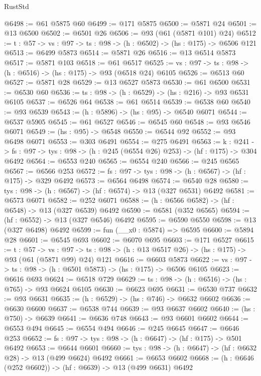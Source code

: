\begin{lexlean}{RustStd}
\begin{coremodule}
@6498 := @61 @5875 @60
@6499 := @171 @5875
@6500 := @5871 @24
@6501 := @13 @6500
@6502 := @6501 @26
@6506 := @93 (@61 (@5871 @101) @24)
@6512 := {t : @57} -> {vs : @97} -> {ts : @98} -> (h : @6502) -> (hs : @175) -> @6506 @121
@6513 := @6499 @5873
@6514 := @5871 @26
@6516 := @13 @6514 @5873
@6517 := @5871 @103
@6518 := @61 @6517
@6525 := {vs : @97} -> {ts : @98} -> (h : @6516) -> (hs : @175) -> @93 (@6518 @24) @6105
@6526 := @6513 @60
@6527 := @5871 @28
@6529 := @13 @6527 @5873
@6530 := @61 @6500
@6531 := @6530 @60
@6536 := {ts : @98} -> (h : @6529) -> (hs : @216) -> @93 @6531 @6105
@6537 := @6526 @64
@6538 := @61 @6514
@6539 := @6538 @60
@6540 := @93 @6539
@6543 := (h : @5896) -> (hs : @95) -> @6540 @6071
@6544 := @6537 @5905
@6545 := @61 @6527
@6546 := @6545 @60
@6548 := @93 @6546 @6071
@6549 := (hs : @95) -> @6548
@6550 := @6544 @92
@6552 := @93 @6498 @6071
@6553 := @303 @6491
@6554 := @275 @6491
@6563 := {k : @241} ->
  {fs : @97} -> {tys : @98} -> (h : @245 (@6554 @26) @253) -> (hf : @175) -> @304 @6492
@6564 := @6553 @240
@6565 := @6554 @240
@6566 := @245 @6565
@6567 := @6566 @253
@6572 := {fs : @97} -> {tys : @98} -> (h : @6567) -> (hf : @175) -> @329 @6492
@6573 := @6564 @6498
@6574 := @6540 @28
@6580 := {tys : @98} -> (h : @6567) -> (hf : @6574) -> @13 (@327 @6531) @6492
@6581 := @6573 @6071
@6582 := @252 @6071
@6588 := (h : @6566 @6582) -> (hf : @6548) -> @13 (@327 @6539) @6492
@6590 := @6581 (@352 @6565)
@6594 := (hf : @6552) -> @13 (@327 @6546) @6492
@6595 := @6590 @6550
@6598 := @13 (@327 @6498) @6492
@6599 := fun (__x0 : @5874) => @6595
@6600 := @5894 @28
@6601 := @6545 @693
@6602 := @6070 @695
@6603 := @171 @6527
@6615 := {t : @57} ->
  {vs : @97} -> {ts : @98} -> (h : @13 @6517 @26) -> (hs : @175) -> @93 (@61 (@5871 @99) @24) @121
@6616 := @6603 @5873
@6622 := {vs : @97} -> {ts : @98} -> (h : @6501 @5873) -> (hs : @175) -> @6506 @6105
@6623 := @6616 @693
@6624 := @6518 @729
@6629 := {ts : @98} -> (h : @6516) -> (hs : @765) -> @93 @6624 @6105
@6630 := @6623 @695
@6631 := @6530 @737
@6632 := @93 @6631
@6635 := (h : @6529) -> (hs : @746) -> @6632 @6602
@6636 := @6630 @6600
@6637 := @6538 @744
@6639 := @93 @6637 @6602
@6640 := (hs : @750) -> @6639
@6641 := @6636 @748
@6643 := @93 @6601 @6602
@6644 := @6553 @494
@6645 := @6554 @494
@6646 := @245 @6645
@6647 := @6646 @253
@6652 := {fs : @97} -> {tys : @98} -> (h : @6647) -> (hf : @175) -> @501 @6492
@6653 := @6644 @6601
@6660 := {tys : @98} -> (h : @6647) -> (hf : @6632 @28) -> @13 (@499 @6624) @6492
@6661 := @6653 @6602
@6668 := (h : @6646 (@252 @6602)) -> (hf : @6639) -> @13 (@499 @6631) @6492

\end{coremodule}
\end{lexlean}
